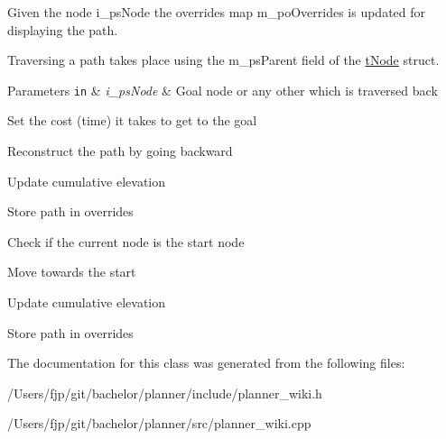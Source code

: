 Given the node i\+\_\+ps\+Node the overrides map m\+\_\+po\+Overrides is updated for displaying the path. 

Traversing a path takes place using the m\+\_\+ps\+Parent field of the \mbox{\hyperlink{structplanner_1_1t_node}{t\+Node}} struct. 
\begin{DoxyParams}[1]{Parameters}
\mbox{\tt in}  & {\em i\+\_\+ps\+Node} & Goal node or any other which is traversed back \\
\hline
\end{DoxyParams}
Set the cost (time) it takes to get to the goal

Reconstruct the path by going backward

Update cumulative elevation

Store path in overrides

Check if the current node is the start node

Move towards the start

Update cumulative elevation

Store path in overrides 

The documentation for this class was generated from the following files\+:\begin{DoxyCompactItemize}
\item 
/\+Users/fjp/git/bachelor/planner/include/planner\+\_\+wiki.\+h\item 
/\+Users/fjp/git/bachelor/planner/src/planner\+\_\+wiki.\+cpp\end{DoxyCompactItemize}
